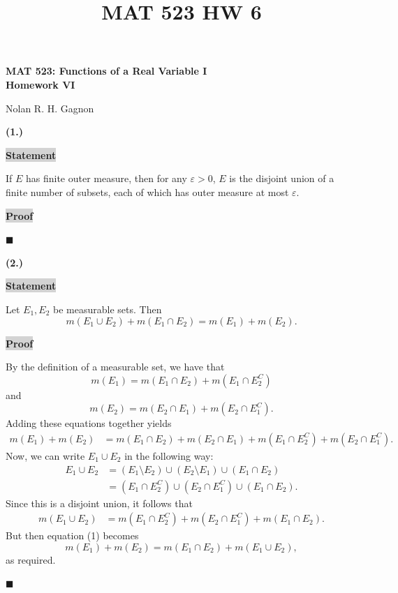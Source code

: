 \documentclass[12pt]{article}
\title{MAT 523 HW 6}
\newcommand{\mybox}{%
    \collectbox{%
        \setlength{\fboxsep}{2pt}%
        \fbox{\BOXCONTENT}%
    }%
}
\begin{document}
\begin{center}
\begin{large}
\textbf{MAT 523: Functions of a Real Variable I \\
Homework VI \\}
\end{large}
Nolan R. H. Gagnon \\
\end{center}

\noindent \textbf{(1.)}

\vspace{3mm}

\noindent\mybox{\colorbox{lightgray}{\textbf{Statement}}}\hspace{3mm}\hrulefill

\noindent If $E$ has finite outer measure, then for any $\varepsilon>0$, $E$ is the disjoint union of a finite number of subsets, each of which has outer measure at most $\varepsilon.$

\vspace{5mm}

\noindent\mybox{\colorbox{lightgray}{\textbf{Proof}}}\hspace{3mm}\hrulefill



\hfill$\blacksquare$

\pagebreak

\noindent \textbf{(2.)} 

\vspace{3mm}

\noindent\mybox{\colorbox{lightgray}{\textbf{Statement}}}\hspace{3mm}\hrulefill 

\noindent Let $E_1, E_2$ be measurable sets. Then $$m(E_1\cup E_2) + m(E_1\cap E_2) = m(E_1) + m(E_2).$$ 

\vspace{5mm}

\noindent\mybox{\colorbox{lightgray}{\textbf{Proof}}}\hspace{3mm}\hrulefill

By the definition of a measurable set, we have that 
$$
m(E_1) = m(E_1\cap E_2) + m\left(E_1\cap E_2^{C}\right)
$$
and
$$
m(E_2) = m(E_2\cap E_1) + m\left(E_2\cap E_1^{C}\right).
$$
Adding these equations together yields
\begin{align}
m(E_1) + m(E_2) &= m(E_1\cap E_2) + m(E_2\cap E_1) + m\left(E_1\cap E_2^{C}\right) + m\left(E_2\cap E_1^{C}\right).
\end{align}
Now, we can write $E_1\cup E_2$ in the following way:
\begin{align*}
    E_1\cup E_2 &= (E_1\setminus E_2)\cup (E_2\setminus E_1) \cup (E_1\cap E_2) \\
    &=\left(E_1\cap E_2^{C}\right)\cup \left(E_2\cap E_1^{C}\right)\cup (E_1\cap E_2).
\end{align*}
Since this is a disjoint union, it follows that
\begin{align*}
    m(E_1\cup E_2) &= m\left(E_1\cap E_2^{C}\right) + m\left(E_2 \cap E_1^{C}\right) + m(E_1\cap E_2).
\end{align*}
But then equation (1) becomes 
$$
m(E_1) + m(E_2) = m(E_1\cap E_2) + m(E_1\cup E_2),
$$
as required.

\hfill$\blacksquare$
\end{document}
